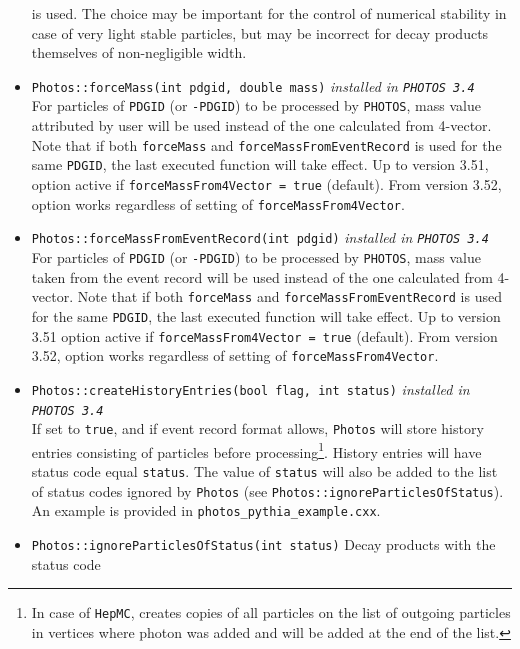 \documentclass[]{Photos_interface_design}
\begin{document}
\begin{itemize}
        is used. The choice may be important for the control 
        of numerical stability in case of very light stable particles, but may be incorrect for decay products 
        themselves of non-negligible width.
  \item {\tt Photos::forceMass(int pdgid, double mass)} {\it  installed in {\tt PHOTOS 3.4}} \\
        For particles of {\tt PDGID} (or {\tt -PDGID})  to be processed by {\tt PHOTOS},
        mass value attributed  by user will be used instead of the one calculated
        from 4-vector. Note that if both {\tt forceMass} and {\tt forceMassFromEventRecord} is
        used for the same {\tt PDGID}, the last executed function will take effect.
        Up to version 3.51, option active if {\tt forceMassFrom4Vector = true} (default).
        From version 3.52, option works regardless of setting of {\tt forceMassFrom4Vector}.
  \item {\tt Photos::forceMassFromEventRecord(int pdgid)} {\it  installed in {\tt PHOTOS 3.4}} \\
        For particles of {\tt PDGID} (or {\tt -PDGID}) to be  processed by {\tt PHOTOS},
        mass value taken from the event record will be used instead of the one
        calculated from 4-vector. Note that if both {\tt forceMass} and {\tt forceMassFromEventRecord} is
        used for the same {\tt PDGID}, the last executed function will take effect.
        Up to version 3.51 option active if {\tt forceMassFrom4Vector = true} (default).
        From version 3.52, option works regardless of setting of {\tt forceMassFrom4Vector}.
  \item {\tt Photos::createHistoryEntries(bool flag, int status)} {\it  installed in {\tt PHOTOS 3.4}} \\
        If set to {\tt true}, and if event record format allows,
        {\tt Photos} will store history entries consisting of particles
        before processing\footnote{In case of {\tt HepMC}, creates copies
        of all particles on the list of outgoing particles in vertices where
        photon was added and will be added at the end of the list.}.
        History entries will have status code equal {\tt status}.
        The value of {\tt status} will also be added to the list of status
        codes ignored by {\tt Photos} (see {\tt Photos::ignoreParticlesOfStatus}).
        An example is provided in  {\tt photos\_pythia\_example.cxx}.
  \item {\tt Photos::ignoreParticlesOfStatus(int status)} Decay products with the status code

\end{itemize}
\end{document}
